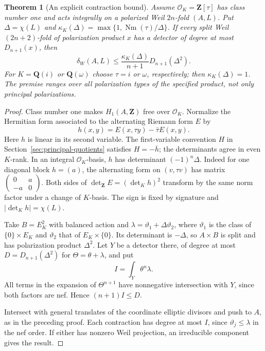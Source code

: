 \documentclass[11pt]{article}
\newtheorem{theorem}{Theorem}[section]
\theoremstyle{definition}
\theoremstyle{remark}
\newcommand{\Q}{\mathbf Q}
\newcommand{\Z}{\mathbf Z}
\newcommand{\Nm}{\operatorname{Nm}}
\begin{document}
\begin{theorem}[An explicit contraction bound]\label{thm:explicit-stabilization}
Assume $\mathcal O_K=\Z[\tau]$ has class number one and acts integrally on a polarized Weil $2n$-fold $(A,L)$. Put $\Delta=\chi(L)$ and
$\kappa_K(\Delta)=\max\{1,\Nm(\tau)/\Delta\}$. If every split Weil $(2n+2)$-fold of polarization product $x$ has a detector of degree at most $D_{n+1}(x)$, then
\[
 \delta_W(A,L)\leq\frac{\kappa_K(\Delta)}{n+1}D_{n+1}(\Delta^2).
\]
For $K=\Q(i)$ or $\Q(\omega)$ choose $\tau=i$ or $\omega$, respectively; then $\kappa_K(\Delta)=1$. The premise ranges over all polarization types of the specified product, not only principal polarizations.
\end{theorem}

\begin{proof}
Class number one makes $H_1(A,\Z)$ free over $\mathcal O_K$. Normalize the Hermitian form associated to the alternating Riemann form $E$ by
\[
 h(x,y)=E(x,\tau y)-\bar\tau E(x,y).
\]
Here $h$ is linear in its second variable. The first-variable
convention $H$ in Section~\ref{sec:principal-quotients} satisfies
$H=-\overline h$; the determinants agree in even $K$-rank.
In an integral $\mathcal O_K$-basis, $h$ has determinant $(-1)^n\Delta$. Indeed for one diagonal block $h=(a)$, the alternating form on $(v,\tau v)$ has matrix $\left(\begin{smallmatrix}0&a\\-a&0\end{smallmatrix}\right)$. Both sides of $\det_\Z E=(\det_Kh)^2$ transform by the same norm factor under a change of $K$-basis. The sign is fixed by signature and $|\det_Kh|=\chi(L)$.

Take $B=E_K^2$ with balanced action and $\lambda=\vartheta_1+\Delta\vartheta_2$, where $\vartheta_1$ is the class of $\{0\}\times E_K$ and $\vartheta_2$ that of $E_K\times\{0\}$. Its determinant is $-\Delta$, so $A\times B$ is split and has polarization product $\Delta^2$. Let $Y$ be a detector there, of degree at most $D=D_{n+1}(\Delta^2)$ for $\Theta=\theta+\lambda$, and put
\[
 I=\int_Y\theta^n\lambda.
\]
All terms in the expansion of $\Theta^{n+1}$ have nonnegative intersection with $Y$, since both factors are nef. Hence $(n+1)I\le D$.

Intersect with general translates of the coordinate elliptic divisors and push to $A$, as in the preceding proof. Each contraction has degree at most $I$, since $\vartheta_j\le\lambda$ in the nef order. If either has nonzero Weil projection, an irreducible component gives the result.


\end{proof}
\end{document}
